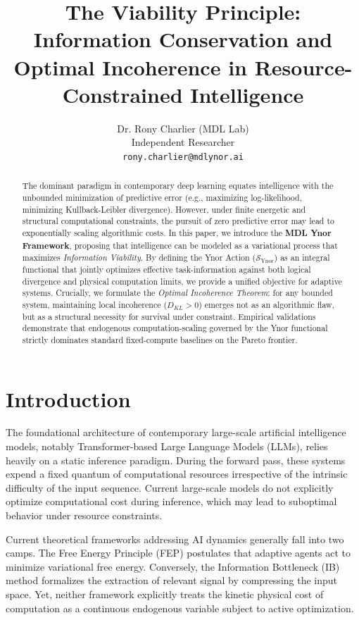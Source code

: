 \documentclass{article}
\title{The Viability Principle: Information Conservation and Optimal Incoherence in Resource-Constrained Intelligence}
\author{%

  Dr. Rony Charlier (MDL Lab) \\

  Independent Researcher \\

  \texttt{rony.charlier@mdlynor.ai} \\

}
\begin{document}
\maketitle



\begin{abstract}

The dominant paradigm in contemporary deep learning equates intelligence with the unbounded minimization of predictive error (e.g., maximizing log-likelihood, minimizing Kullback-Leibler divergence). However, under finite energetic and structural computational constraints, the pursuit of zero predictive error may lead to exponentially scaling algorithmic costs. In this paper, we introduce the \textbf{MDL Ynor Framework}, proposing that intelligence can be modeled as a variational process that maximizes \textit{Information Viability}. By defining the Ynor Action ($\mathcal{S}_{\text{Ynor}}$) as an integral functional that jointly optimizes effective task-information against both logical divergence and physical computation limits, we provide a unified objective for adaptive systems. Crucially, we formulate the \textit{Optimal Incoherence Theorem}: for any bounded system, maintaining local incoherence ($D_{KL} > 0$) emerges not as an algorithmic flaw, but as a structural necessity for survival under constraint. Empirical validations demonstrate that endogenous computation-scaling governed by the Ynor functional strictly dominates standard fixed-compute baselines on the Pareto frontier.

\end{abstract}



\section{Introduction}



The foundational architecture of contemporary large-scale artificial intelligence models, notably Transformer-based Large Language Models (LLMs), relies heavily on a static inference paradigm. During the forward pass, these systems expend a fixed quantum of computational resources irrespective of the intrinsic difficulty of the input sequence. Current large-scale models do not explicitly optimize computational cost during inference, which may lead to suboptimal behavior under resource constraints.



Current theoretical frameworks addressing AI dynamics generally fall into two camps. The Free Energy Principle (FEP) \cite{friston2010} postulates that adaptive agents act to minimize variational free energy. Conversely, the Information Bottleneck (IB) method \cite{tishby1999} formalizes the extraction of relevant signal by compressing the input space. Yet, neither framework explicitly treats the kinetic physical cost of computation as a continuous endogenous variable subject to active optimization.
\end{document}
